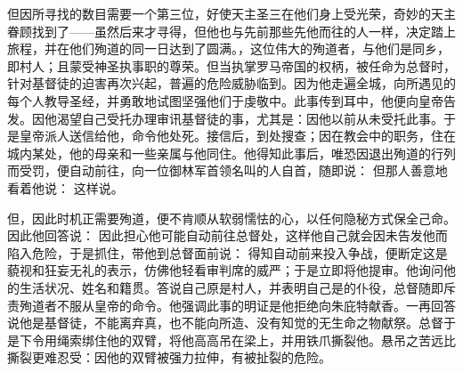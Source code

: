 但因所寻找的数目需要一个第三位，好使天主圣三在他们身上受光荣，奇妙的天主眷顾找到了——虽然后来才寻得，但他也与先前那些先他而往的人一样，决定踏上旅程，并在他们殉道的同一日达到了圆满。，这位伟大的殉道者，与他们是同乡，即村人；且蒙受神圣执事职的尊荣。但当执掌罗马帝国的权柄，被任命为总督时，针对基督徒的迫害再次兴起，普遍的危险威胁临到。因为他走遍全城，向所遇见的每个人教导圣经，并勇敢地试图坚强他们于虔敬中。此事传到耳中，他便向皇帝告发。因他渴望自己受托办理审讯基督徒的事，尤其是：因他以前从未受托此事。于是皇帝派人送信给他，命令他处死。接信后，到处搜查；因在教会中的职务，住在城内某处，他的母亲和一些亲属与他同住。他得知此事后，唯恐因退出殉道的行列而受罚，便自动前往，向一位御林军首领名叫的人自首，随即说： 但那人善意地看着他说： 这样说。\par

但，因此时机正需要殉道，便不肯顺从软弱懦怯的心，以任何隐秘方式保全己命。因此他回答说： 因此担心他可能自动前往总督处，这样他自己就会因未告发他而陷入危险，于是抓住，带他到总督面前说： 得知自动前来投入争战，便断定这是藐视和狂妄无礼的表示，仿佛他轻看审判席的威严；于是立即将他提审。他询问他的生活状况、姓名和籍贯。答说自己原是村人，并表明自己是的仆役，总督随即斥责殉道者不服从皇帝的命令。他强调此事的明证是他拒绝向朱庇特献香。一再回答说他是基督徒，不能离弃真，也不能向所造、没有知觉的无生命之物献祭。总督于是下令用绳索绑住他的双臂，将他高高吊在梁上，并用铁爪撕裂他。悬吊之苦远比撕裂更难忍受：因他的双臂被强力拉伸，有被扯裂的危险。\par

